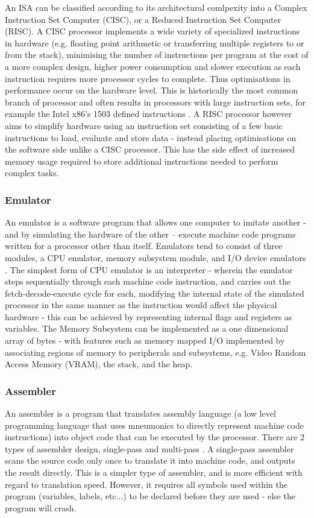 An ISA can be classified according to its architectural comlpexity into a Complex Instruction Set Computer (CISC), or a Reduced Instruction Set Computer (RISC). A CISC processor implements a wide variety of specialized instructions in hardware (e.g. floating point arithmetic or transferring multiple registers to or from the stack), minimising the number of instructions per program at the cost of a more complex design, higher power consumption and slower execution as each instruction requires more processor cycles to complete. \textcite{gfg-risc-vs-cisc} Thus optimisations in performance occur on the hardware level. This is historically the most common branch of processor and often results in processors with large instruction sets, for example the Intel x86's 1503 defined instructions \textcite{ryg-blog}. A RISC processor however aims to simplify hardware using an instruction set consisting of a few basic instructions to load, evaluate and store data - instead placing optimisations on the software side unlike a CISC processor. This has the side effect of increased memory usage required to store additional instructions needed to perform complex tasks.

\subsubsection{Emulator}
\label{sec:Emulator}
An emulator is a software program that allows one computer to imitate another - and by simulating the hardware of the other – execute machine code programs written for a processor other than itself. Emulators tend to consist of three modules, a CPU emulator, memory subsystem module, and I/O device emulators \textcite{retroreversing}. The simplest form of CPU emulator is an interpreter - wherein the emulator steps sequentially through each machine code instruction, and carries out the fetch-decode-execute cycle for each, modifying the internal state of the simulated processor in the same manner as the instruction would affect the physical hardware - this can be achieved by representing internal flags and registers as variables. The Memory Subsystem can be implemented as a one dimensional array of bytes - with features such as memory mapped I/O implemented by associating regions of memory to peripherals and subsystems, e.g. Video Random Access Memory (VRAM), the stack, and the heap. 

\subsubsection{Assembler}
\label{sec:Assembler}
An assembler is a program that translates assembly language (a low level programming language that uses mneumonics to directly represent machine code instructions) into object code that can be executed by the processor. There are 2 types of assembler design, single-pass and multi-pass \textcite{TOPPR-assembler}. A single-pass assembler scans the source code only once to translate it into machine code, and outputs the result directly. This is a simpler type of assembler, and is more efficient with regard to translation speed. However, it requires all symbols used within the program (variables, labels, etc...) to be declared before they are used - else the program will crash. 

